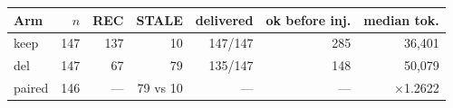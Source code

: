 \begin{tabular}{lrrrrrr}
\toprule
Arm & $n$ & REC & STALE & delivered & ok before inj. & median tok. \\
\midrule
keep & 147 & 137 & 10 & 147/147 & 285 & 36,401 \\
del  & 147 & 67 & 79 & 135/147 & 148 & 50,079 \\
\midrule
paired & 146 & --- & 79 vs 10 & --- & --- & $\times$1.2622 \\
\bottomrule
\end{tabular}
